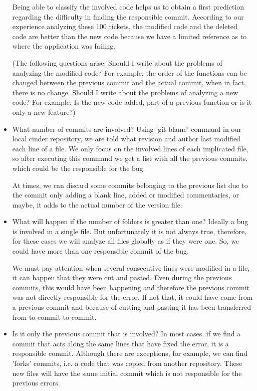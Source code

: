 \documentclass[a4paper]{article}
\begin{document}
\begin{itemize}
Being able to classify the involved code helps us to obtain a first prediction regarding the difficulty in finding the responsible commit. According to our experience analyzing these 100 tickets,  the modified code and the deleted code are better than the new code because we have a limited reference as to  where the application was failing.

(The following questions arise;
Should I write about the problems of analyzing the modified code? 
For example: the order of the functions can be changed between the previous commit and the actual commit, when in fact, there is no change.
Should I write about the problems of analyzing a new code? 
For example: Is the new code added, part of a previous function or is it only a new feature?)

\item What number of commits are involved?
 Using 'git blame' command in our local cinder repository, we are told what revision and author last modified each line of a file. We only focus on the involved lines of each implicated file, so after executing this command we get a list with all the previous commits, which could be the responsible for the bug.
 
At times, we can discard some commits belonging to the previous list due to the commit only adding a blank line, added or modified commentaries, or maybe, it adds to the actual number of the version file.

\item What will happen if the number of folders is greater than one? 
Ideally a bug is involved in a single file. But unfortunately it is not always true, therefore, for these cases we will analyze all files globally as if they were one. So, we could have more than one responsible commit of the bug.

We must pay attention when several consecutive lines were modified in a file, it can happen that they were cut and pasted. Even during the previous commits, this would have been happening and therefore the previous commit was not directly responsible for the error. If not that, it could have come from a previous commit and because of cutting and pasting it has been transferred from to commit to commit.

\item Is it only the previous commit that is involved?
In most cases, if we find a commit that acts along the same lines that have fixed the error, it is a responsible commit. Although there are exceptions, for example, we can find 'forks' commits, i.e. a code that was copied from another repository. These new files will have the same initial commit which is not responsible for the previous errors.


\end{itemize}
\end{document}
